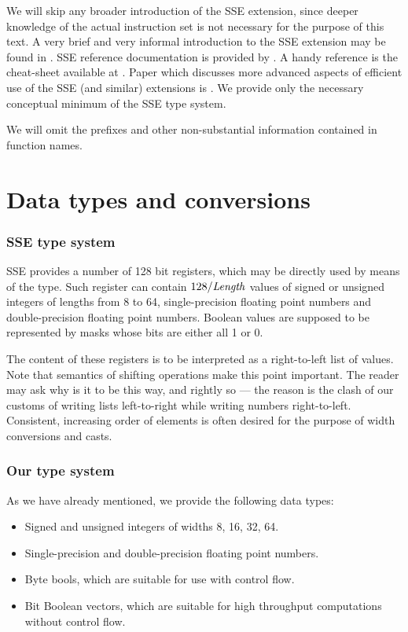 We will skip any broader introduction of the SSE extension, since deeper knowledge of the actual instruction set is not necessary for the purpose of this text. A very brief and very informal introduction to the SSE extension may be found in \cite{ssetut}. SSE reference documentation is provided by \cite{reference}. A handy reference is the cheat-sheet available at \cite{cheats}. Paper which discusses more advanced aspects of efficient use of the SSE (and similar) extensions is \cite{autotuning}. We provide only the necessary conceptual minimum of the SSE type system.

We will omit the  prefixes and other non-substantial information contained in function names.

\section{Data types and conversions} 

\subsubsection{SSE type system}

SSE provides a number of 128 bit registers, which may be directly used by means of the  type. Such register can contain $128/\mf{length}$ values of signed or unsigned integers of lengths from 8 to 64, single-precision floating point numbers and double-precision floating point numbers. Boolean values are supposed to be represented by masks whose bits are either all 1 or 0.

The content of these registers is to be interpreted as a right-to-left list of values. Note that semantics of shifting operations make this point important. The reader may ask why is it to be this way, and rightly so --- the reason is the clash of our customs of writing lists left-to-right while writing numbers right-to-left. Consistent, increasing order of elements is often desired for the purpose of width conversions and casts.

\subsubsection{Our type system}

As we have already mentioned, we provide the following data types:
\begin{itemize}
\item Signed and unsigned integers of widths 8, 16, 32, 64.
\item Single-precision and double-precision floating point numbers.
\item Byte bools, which are suitable for use with control flow.
\item Bit Boolean vectors, which are suitable for high throughput computations without control flow.
\end{itemize}

